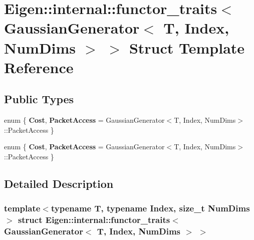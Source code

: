 \hypertarget{struct_eigen_1_1internal_1_1functor__traits_3_01_gaussian_generator_3_01_t_00_01_index_00_01_num_dims_01_4_01_4}{}\section{Eigen\+:\+:internal\+:\+:functor\+\_\+traits$<$ Gaussian\+Generator$<$ T, Index, Num\+Dims $>$ $>$ Struct Template Reference}
\label{struct_eigen_1_1internal_1_1functor__traits_3_01_gaussian_generator_3_01_t_00_01_index_00_01_num_dims_01_4_01_4}
\subsection*{Public Types}
\begin{DoxyCompactItemize}
\item 
\mbox{\label{struct_eigen_1_1internal_1_1functor__traits_3_01_gaussian_generator_3_01_t_00_01_index_00_01_num_dims_01_4_01_4_ad798f6b240396c3327973483b67257c4}} 
enum \{ {\bfseries Cost}, 
{\bfseries Packet\+Access} = Gaussian\+Generator$<$T, Index, Num\+Dims$>$\+:\+:Packet\+Access
 \}
\item 
\mbox{\label{struct_eigen_1_1internal_1_1functor__traits_3_01_gaussian_generator_3_01_t_00_01_index_00_01_num_dims_01_4_01_4_aa44234b725adfb5b43d087422dc5daea}} 
enum \{ {\bfseries Cost}, 
{\bfseries Packet\+Access} = Gaussian\+Generator$<$T, Index, Num\+Dims$>$\+:\+:Packet\+Access
 \}
\end{DoxyCompactItemize}


\subsection{Detailed Description}
\subsubsection*{template$<$typename T, typename Index, size\+\_\+t Num\+Dims$>$\newline
struct Eigen\+::internal\+::functor\+\_\+traits$<$ Gaussian\+Generator$<$ T, Index, Num\+Dims $>$ $>$}



